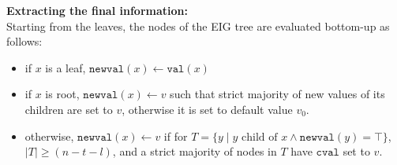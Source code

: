 \textbf{Extracting the final information:}\\
Starting from the leaves, the nodes of the EIG tree are evaluated bottom-up as follows:
\begin{itemize}
    \item if $x$ is a leaf, $\mathtt{newval}(x) \leftarrow \mathtt{val}(x)$
    \item if $x$ is root, $\mathtt{newval}(x) \leftarrow v$ such that strict majority of new values of its children are set to $v$, otherwise it is set to default value $v_0$.
    \item otherwise, $\mathtt{newval}(x) \leftarrow v$ if for $T = \{y \mid y \text{ child of } x \wedge \mathtt{newval}(y) = \top\}$, $\mid T \mid \geq (n-t-l)$, and a strict majority of nodes in $T$ have $\mathtt{cval}$ set to $v$.
\end{itemize}


